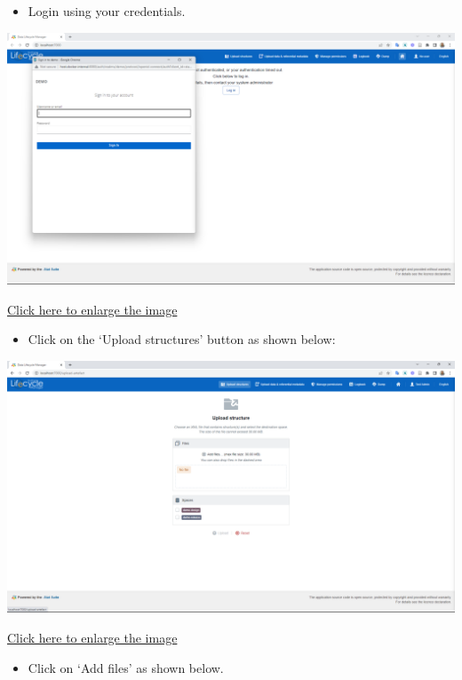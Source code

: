 \documentclass[
]{book}
\providecommand{\tightlist}{%
  \setlength{\itemsep}{0pt}\setlength{\parskip}{0pt}}
\begin{document}
\begin{itemize}
\tightlist
\item
  Login using your credentials.
\end{itemize}

\begin{center}\includegraphics[width=1\linewidth]{./images/image190} \end{center}

\href{images/image190.png}{Click here to enlarge the image}

\begin{itemize}
\tightlist
\item
  Click on the `Upload structures' button as shown below:
\end{itemize}

\begin{center}\includegraphics[width=1\linewidth]{./images/image192} \end{center}

\href{images/image192.png}{Click here to enlarge the image}

\begin{itemize}
\tightlist
\item
  Click on `Add files' as shown below.
\end{itemize}
\end{document}
